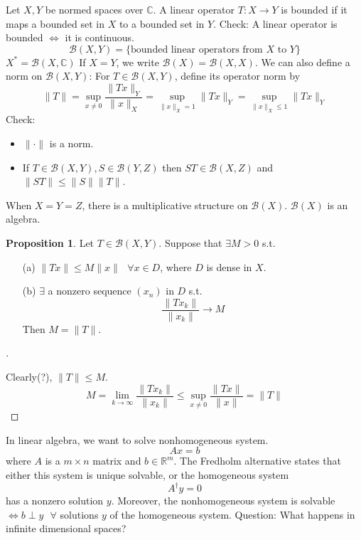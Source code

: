 \documentclass{article}
\newcommand{\sfa}{\text{  } \forall}
\theoremstyle{definition}
\newtheorem{prop}{Proposition}
\newenvironment{proofs}[1][\proofname]{%
  \begin{proof}[#1]$ $\par\nobreak\ignorespaces
}{%
  \end{proof}
}
\begin{document}
Let $X, Y$ be normed spaces over $\mathbb{C}$.
A linear operator $T:X \to Y$ is bounded if it maps a bounded set in $X$ to a bounded set in $Y$.
Check: A linear operator is bounded $\Leftrightarrow$ it is continuous.
\[
	\mathcal{B}(X, Y) = \{\text{bounded linear operators from }X \text{ to }Y \}
\]
$X^* = \mathcal{B}(X, \mathbb{C})$
If $X = Y$, we write $\mathcal{B}(X) = \mathcal{B}(X, X)$.
We can also define a norm on $\mathcal{B}(X, Y)$:
For $T \in \mathcal{B}(X, Y)$, define its operator norm by 
\[
	\|T\| = \sup_{x \neq 0} \frac{\|T x \|_Y}{\|x\|_X} = \sup_{\|x\|_X = 1} \|Tx\|_Y = \sup_{\|x\|_X \leq 1} \|Tx\|_Y
\]
Check: 
\begin{itemize}
	\item $\|\cdot\|$ is a norm.

	\item If $T \in \mathcal{B}(X, Y), S \in \mathcal{B}(Y, Z)$ then $ST \in \mathcal{B}(X, Z)$ and $\|ST\| \leq \|S\|\|T\|$.

\end{itemize}

When $X = Y = Z$, there is a multiplicative structure on $\mathcal{B}(X)$.
$\mathcal{B}(X)$ is an algebra.

\begin{prop}
	Let $T \in \mathcal{B}(X, Y)$. 
	Suppose that $\exists M > 0$ s.t.
	\begin{enumerate}
		\item[(a)] $\|Tx\| \leq M \|x\| \sfa x \in D$, where $D$ is dense in $X$.

		\item[(b)] $\exists$ a nonzero sequence $(x_n)$ in $D$ s.t.
			\[
				\frac{\|T x_k\|}{\|x_k\|} \to M
			\]
			Then $M = \|T\|$.
	\end{enumerate}
\end{prop}

\begin{proofs}
	Clearly(?), $\|T\| \leq M$.
	\[
		M = \lim_{k \to \infty}\frac{\|T x_k\|}{\|x_k\|} \leq \sup_{x \neq 0}\frac{\|Tx\|}{\|x\|} = \|T\|
	\]
\end{proofs}

In linear algebra, we want to solve nonhomogeneous system.
\[
	Ax = b
\]
where $A$ is a $m \times n$ matrix and $b \in \mathbb{R}^m$.
The Fredholm alternative states that either this system is unique solvable, or the homogeneous system
\[
	A^{\dagger} y = 0
\]
has a nonzero solution $y$.
Moreover, the nonhomogeneous system is solvable $\Leftrightarrow b \perp y \sfa$ solutions $y$ of the homogeneous system. 
Question: What happens in infinite dimensional spaces?
\end{document}
